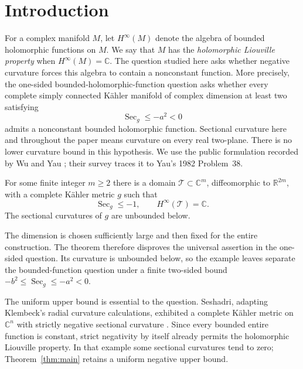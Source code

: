 \section{Introduction}
\label{sec:introduction}

For a complex manifold $M$, let $H^\infty(M)$ denote the algebra of
bounded holomorphic functions on $M$. We say that $M$ has the
\emph{holomorphic Liouville property} when $H^\infty(M)=\mathbb C$.
The question studied here asks whether negative curvature forces this
algebra to contain a nonconstant function. More precisely, the one-sided
bounded-holomorphic-function question asks whether every complete simply
connected K\"ahler manifold of complex dimension at least two satisfying
\begin{equation}\label{eq:one-sided-question}
 \operatorname{Sec}_g\le -a^2<0
\end{equation}
admits a nonconstant bounded holomorphic function. Sectional curvature
here and throughout the paper means curvature on every real two-plane.
There is no lower curvature bound in this hypothesis. We use the public
formulation recorded by Wu and Yau \citep[p.~103]{WuYau2020}; their
survey \citep[Section~3, p.~9]{WuYauSurvey2019} traces it to Yau's
1982 Problem~38.

\begin{theorem}\label{thm:main}
For some finite integer $m\ge2$ there is a domain
$\mathcal T\subset\mathbb C^m$, diffeomorphic to $\mathbb R^{2m}$,
with a complete K\"ahler metric $g$ such that
\[
 \operatorname{Sec}_g\le-1,
 \qquad H^\infty(\mathcal T)=\mathbb C.
\]
The sectional curvatures of $g$ are unbounded below.
\end{theorem}

The dimension is chosen sufficiently large and then fixed for the
entire construction. The theorem therefore disproves the universal
assertion in the one-sided question. Its curvature is unbounded below,
so the example leaves separate the bounded-function question under a
finite two-sided bound
$-b^2\le\operatorname{Sec}_g\le-a^2<0$.

The uniform upper bound is essential to the question. Seshadri,
adapting Klembeck's radial curvature calculations, exhibited a complete
K\"ahler metric on $\mathbb C^n$ with strictly negative sectional
curvature \citep[Section~3]{Seshadri2006}. Since every bounded entire
function is constant, strict negativity by itself already permits the
holomorphic Liouville property. In that example some sectional
curvatures tend to zero; Theorem~\ref{thm:main} retains a uniform
negative upper bound.


